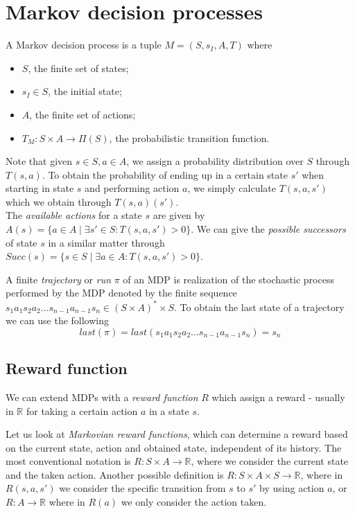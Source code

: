 \section{Markov decision processes}

\begin{definition}[MDP]
	A Markov decision process is a tuple $M=(S,s_I,A,T)$ where 
	\begin{itemize}
		\item $S$, the finite set of states;
		\item $s_I\in S$, the initial state;
		\item $A$, the finite set of actions;
		\item $T_{M}:S\times A\to \Pi(S)$, the probabilistic transition function.
	\end{itemize}
\end{definition}

Note that given $s\in S,a\in A$, we assign a probability distribution over $S$ through $T(s,a)$. To obtain the probability of ending up in a certain state $s'$ when starting in state $s$ and performing action $a$, we simply calculate $T(s,a,s')$ which we obtain through $T(s,a)(s')$.\\

The \textit{available actions} for a state $s$ are given by $A(s)=\{a\in A\mid \exists s'\in S: T(s,a,s')>0\}$. We can give the \textit{possible successors} of state $s$ in a similar matter through $Succ(s)=\{s\in S\mid\exists a\in A : T(s,a,s')>0\}$.

A finite \textit{trajectory} or \textit{run} $\pi$ of an MDP is realization of the stochastic process performed by the MDP denoted by the finite sequence $s_1 a_1 s_2 a_2\dots s_{n-1} a_{n-1} s_n \in (S\times A)^*\times S$. To obtain the last state of a trajectory we can use the following \[last(\pi)=last(s_1 a_1 s_2 a_2\dots s_{n-1} a_{n-1} s_n)=s_n\]

\subsection*{Reward function}
We can extend MDPs with a \textit{reward function} $R$ which assign a reward - usually in $\mathbb{R}$ for taking a certain action $a$ in a state $s$. 


Let us look at \textit{Markovian reward functions}, which can determine a reward based on the current state, action and obtained state, independent of its history. The most conventional notation is $R:S\times A\to \mathbb{R}$, where we consider the current state and the taken action. Another possible definition is $R:S\times A\times S\to\mathbb{R}$, where  in $R(s,a,s')$ we consider the specific transition from $s$ to $s'$ by using action $a$, or $R:A\to\mathbb{R}$ where in $R(a)$ we only consider the action taken. 

